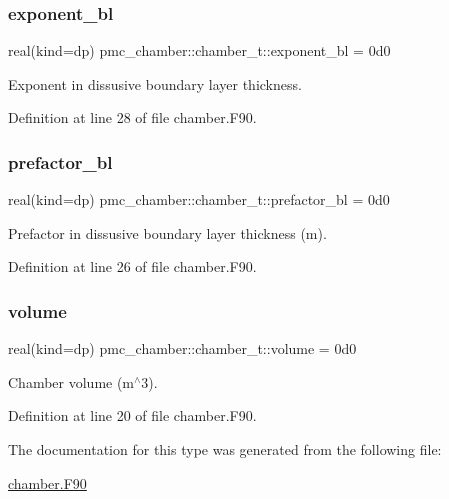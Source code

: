 \subsubsection{\texorpdfstring{exponent\+\_\+bl}{exponent\_bl}}
{\footnotesize\ttfamily real(kind=dp) pmc\+\_\+chamber\+::chamber\+\_\+t\+::exponent\+\_\+bl = 0d0}



Exponent in dissusive boundary layer thickness. 



Definition at line 28 of file chamber.\+F90.

\mbox{\label{structpmc__chamber_1_1chamber__t_aeb404a20867090627a86dca9b82a97ca}} 
\subsubsection{\texorpdfstring{prefactor\+\_\+bl}{prefactor\_bl}}
{\footnotesize\ttfamily real(kind=dp) pmc\+\_\+chamber\+::chamber\+\_\+t\+::prefactor\+\_\+bl = 0d0}



Prefactor in dissusive boundary layer thickness (m). 



Definition at line 26 of file chamber.\+F90.

\mbox{\label{structpmc__chamber_1_1chamber__t_ac80cf7de556630da110cf01d16313216}} 
\subsubsection{\texorpdfstring{volume}{volume}}
{\footnotesize\ttfamily real(kind=dp) pmc\+\_\+chamber\+::chamber\+\_\+t\+::volume = 0d0}



Chamber volume (m$^\wedge$3). 



Definition at line 20 of file chamber.\+F90.



The documentation for this type was generated from the following file\+:\begin{DoxyCompactItemize}
\item 
\mbox{\hyperlink{chamber_8_f90}{chamber.\+F90}}\end{DoxyCompactItemize}
